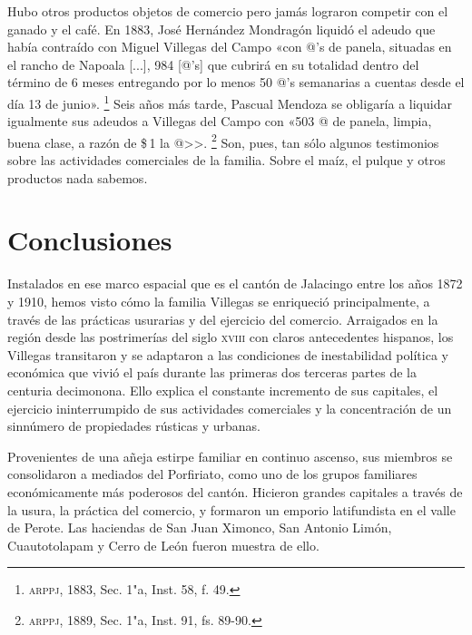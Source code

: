 \documentclass[14pt,twoside,final]{extbook} %
\let\oldfootnote\footnote
\renewcommand\footnote[1]{%
\oldfootnote{\hspace{1mm}#1}}
\begin{document}
Hubo otros productos objetos de comercio pero jamás lograron competir con el ganado y el café. En 1883, José Hernández Mondragón liquidó el adeudo que había contraído con Miguel Villegas del Campo «con @'s de panela, situadas en el rancho de Napoala [...], 984 [@'s] que cubrirá en su totalidad dentro del término de 6 meses entregando por lo menos 50 @'s semanarias a cuentas desde el día 13 de junio».\footnote{\textsc{arppj}, 1883, Sec. 1"a, Inst. 58, f. 49.} Seis años más tarde, Pascual Mendoza se obligaría a liquidar igualmente sus adeudos a Villegas del Campo con «503 @ de panela, limpia, buena clase, a razón de \$\,1 la @>>.\footnote{\textsc{arppj}, 1889, Sec. 1"a, Inst. 91, fs. 89-90.} Son, pues, tan sólo algunos testimonios sobre las actividades comerciales de la familia. Sobre el maíz, el pulque y otros productos nada sabemos.
\chapter*{Conclusiones}
\label{ch:conclusiones}
\thispagestyle{empty}
\pagestyle{fancy}
\fancyhf{} %
\fancyhead[RO,LE]{\iffloatpage{}{\thepage}}
\renewcommand\headrulewidth{\iffloatpage{0pt}{0pt}}
Instalados en ese marco espacial que es el cantón de Jalacingo entre los años 1872 y 1910, hemos visto cómo la familia Villegas se enriqueció principalmente, a través de las prácticas usurarias y del ejercicio del comercio. Arraigados en la región desde las postrimerías del siglo \textsc{xviii} con claros antecedentes hispanos, los Villegas transitaron y se adaptaron a las condiciones de inestabilidad política y económica que vivió el país durante las primeras dos terceras partes de la centuria decimonona. Ello explica el constante incremento de sus capitales, el ejercicio ininterrumpido de sus actividades comerciales y la concentración de un sinnúmero de propiedades rústicas y urbanas.

Provenientes de una añeja estirpe familiar en continuo ascenso, sus miembros se consolidaron a mediados del Porfiriato, como uno de los grupos familiares económicamente más poderosos del cantón. Hicieron grandes capitales a través de la usura, la práctica del comercio, y formaron un emporio latifundista en el valle de Perote. Las haciendas de San Juan Ximonco, San Antonio Limón, Cuautotolapam y Cerro de León fueron muestra de ello.
\end{document}
